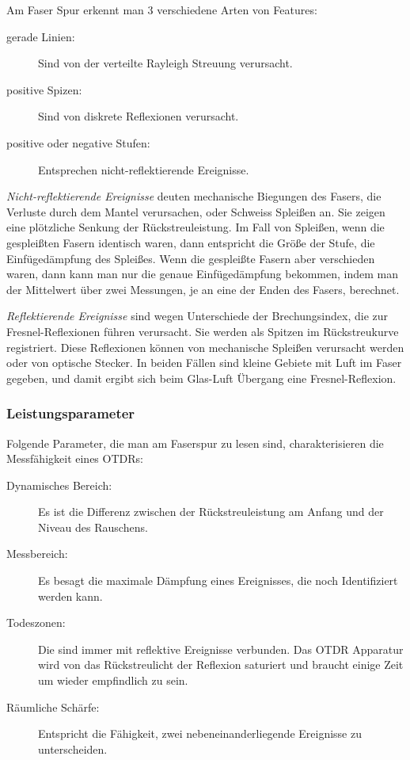 \documentclass[a4paper]{article}
\begin{document}
Am Faser Spur erkennt man 3 verschiedene Arten von Features:
\begin{description}
  \item[gerade Linien:] Sind von der verteilte Rayleigh Streuung verursacht.
  \item[positive Spizen:] Sind von diskrete Reflexionen verursacht.
  \item[positive oder negative Stufen:] Entsprechen nicht-reflektierende
    Ereignisse. 
\end{description}

\emph{Nicht-reflektierende Ereignisse} deuten mechanische Biegungen des Fasers,
die Verluste durch dem Mantel verursachen, oder Schweiss Spleißen an. Sie
zeigen eine plötzliche Senkung der Rückstreuleistung. Im Fall von Spleißen,
wenn die gespleißten Fasern identisch waren, dann entspricht die Größe der
Stufe, die Einfügedämpfung des Spleißes. Wenn die gespleißte Fasern aber
verschieden waren, dann kann man nur die genaue Einfügedämpfung bekommen, indem
man der Mittelwert über zwei Messungen, je an eine der Enden des Fasers,
berechnet. 

\emph{Reflektierende Ereignisse} sind wegen Unterschiede der Brechungsindex,
die zur Fresnel-Reflexionen führen verursacht. Sie werden als Spitzen im
Rückstreukurve registriert. Diese Reflexionen können von mechanische Spleißen
verursacht werden oder von optische Stecker. In beiden Fällen sind kleine
Gebiete mit Luft im Faser gegeben, und damit ergibt sich beim Glas-Luft
Übergang eine Fresnel-Reflexion.

\subsubsection{Leistungsparameter}

Folgende Parameter, die man am Faserspur zu lesen sind, charakterisieren die
Messfähigkeit eines OTDRs:

\begin{description}
  \item[Dynamisches Bereich:] Es ist die Differenz zwischen der 
    Rückstreuleistung am Anfang und der Niveau des Rauschens.
  \item[Messbereich:] Es besagt die maximale Dämpfung eines Ereignisses, die
    noch Identifiziert werden kann.
  \item[Todeszonen:] Die sind immer mit reflektive Ereignisse verbunden. Das
    OTDR Apparatur wird von das Rückstreulicht der Reflexion saturiert und
    braucht einige Zeit um wieder empfindlich zu sein.
  \item[Räumliche Schärfe:] Entspricht die Fähigkeit, zwei
    nebeneinanderliegende Ereignisse zu unterscheiden.
\end{description}
\end{document}

